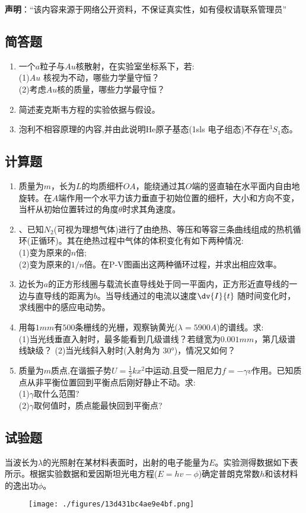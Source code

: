 
\textbf{声明}：“该内容来源于网络公开资料，不保证真实性，如有侵权请联系管理员”

\subsection{简答题}
\begin{enumerate}
\item 一个$a$粒子与$Au$核散射，在实验室坐标系下，若:\\
(1)$Au$ 核视为不动，哪些力学量守恒？\\
(2)考虑$Au$核的质量，哪些力学最守恒？
\item 简述麦克斯韦方程的实验依据与假设。
\item 泡利不相容原理的内容,并由此说明He原子基态(1sls 电子组态)不存在$^3S_1$态。
\end{enumerate}
\subsection{计算题}
\begin{enumerate}
\item 质量为$m$，长为$L$的均质细杆$OA$，能绕通过其$O$端的竖直轴在水平面内自由地旋转。在$A$端作用一个水平力该力垂直于初始位置的细杆，大小和方向不变，当杆从初始位置转过的角度$\theta$时求其角速度。
\item 、已知$ N_2$(可视为理想气体)进行了由绝热、等压和等容三条曲线组成的热机循环(正循环)。其在绝热过程中气体的体积变化有如下两种情况:\\
(1)变为原来的$n$倍;\\
(2)变为原来的$1/n$倍。在P-V图画出这两种循环过程，并求出相应效率。
\item 边长为$a$的正方形线圈与载流长直导线处于同一平面内，正方形近直导线的一边与直导线的距离为$b$。当导线通过的电流以速度$\dv{I}{t}$ 随时间变化时，求线圈中的感应电动势。
\item 用每$1mm$有$500$条栅线的光栅，观察钠黄光($\lambda=5900A$)的谱线。求:\\
(1)当光线垂直入射时，最多能看到几级谱线？若缝宽为$0.001mm$，第几级谱线缺级？
(2)当光线斜入射时(入射角为 $30$°)，情况又如何？
\item 质量为$m$质点,在谐振子势$U=\frac{1}{2}kx^2$中运动,且受一阻尼力$f=-\gamma v$作用。已知质点从非平衡位置回到平衡点后刚好静止不动。求:\\
(1)$\gamma$取什么范围?\\
(2)$\gamma$取何值时，质点能最快回到平衡点?
\end{enumerate}
\subsection{试验题}
当波长为$\lambda$的光照射在某材料表面时，出射的电子能量为$E$。实验测得数据如下表所示。根据实验数据和爱因斯坦光电方程($E=hv-\phi$)确定普朗克常数$h$和该材料的逸出功$\phi$。
\begin{figure}[ht]
\centering
\texttt{[image: ./figures/13d431bc4ae9e4bf.png]}
\caption{} \label{fig_SY06_1}
\end{figure}